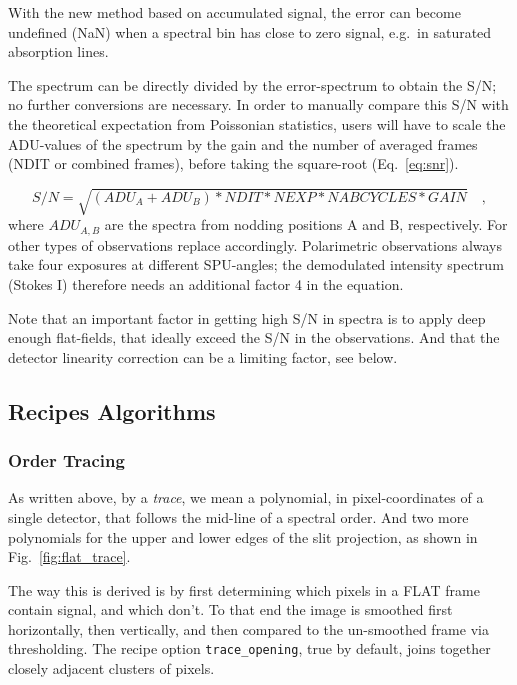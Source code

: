 With the new method based on
accumulated signal, the error can become undefined (NaN) when a spectral bin has
close to zero signal, e.g.~in saturated absorption lines.

The spectrum can be directly divided by the error-spectrum to obtain the
S/N; no further conversions are necessary. 
In order to manually compare this S/N with the theoretical expectation from
Poissonian statistics, users will have to scale the ADU-values of the spectrum
by the gain and the number of averaged frames (NDIT or combined frames), before
taking the square-root (Eq.~\ref{eq:snr}).

\begin{equation}
    \label{eq:snr}
    S/N = \sqrt{(ADU_A+ADU_B)*NDIT*NEXP*NABCYCLES*GAIN}\quad ,
\end{equation}
where $ADU_{A,B}$ are the spectra from nodding positions A and B, respectively.
For other types of observations replace accordingly. Polarimetric observations
always take four exposures at different SPU-angles; the demodulated intensity
spectrum (Stokes I) therefore needs an additional factor 4 in the equation.

Note that an important factor in getting high S/N in spectra is to apply deep
enough flat-fields, that ideally exceed the S/N in the observations. And that
the detector linearity correction can be a limiting factor, see below.

\subsection{Recipes Algorithms} 
\label{sec:algorithms-recipes}

\subsubsection{Order Tracing}
\label{sec:ordertrace}

As written above, by a \emph{trace}, we mean a polynomial, in pixel-coordinates
of a single detector, that follows the mid-line of a spectral order. And two
more polynomials for the upper and lower edges of the slit projection, as shown
in Fig.~\ref{fig:flat_trace}.

The way this is derived is by first determining which pixels in a FLAT frame
contain signal, and which don't. To that end the image is smoothed first
horizontally, then vertically, and then compared to the un-smoothed frame via
thresholding. The recipe option \verb!trace_opening!, true by default, joins
together closely adjacent clusters of pixels.

